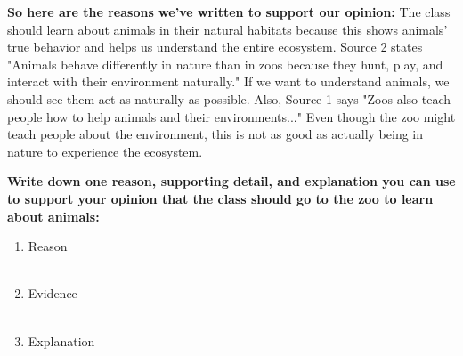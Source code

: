 \documentclass[12pt]{article}
\begin{document}
\begin{tcolorbox}[colframe=black!60, colback=white, 
coltitle=black, colbacktitle=black!15, fonttitle=\bfseries\Large, 
title=Examples, halign title=center, left=10pt, right=10pt, top=10pt, bottom=15pt]
\textbf{So here are the reasons we've written to support our opinion:} The class should learn about animals in their natural habitats because this shows animals' true behavior and helps us understand the entire ecosystem. Source 2 states  "Animals behave differently in nature than in zoos because they hunt, play, and interact with their environment naturally." If we want to understand animals, we should see them act as naturally as possible. Also, Source 1 says "Zoos also teach people how to help animals and their environments..." Even though the zoo might teach people about the environment, this is not as good as actually being in nature to experience the ecosystem.




 


     \end{tcolorbox}
\vspace{1em}



\begin{tcolorbox}[colframe=black!60, colback=white, 
coltitle=black, colbacktitle=black!15, fonttitle=\bfseries\Large, 
title=Guided Practice, halign title=center, left=10pt, right=10pt, top=10pt, bottom=15pt]
\textbf{Write down one reason, supporting detail, and explanation you can use to support your opinion that the class should go to the zoo to learn about animals:}
\begin{enumerate}[itemsep=3em] %
    \item Reason
    \\[0.8cm] \underline{\hspace{14.3cm}}  
    \\[0.8cm] \underline{\hspace{14.3cm}} 
    \item Evidence
     \\[0.8cm] \underline{\hspace{14.3cm}}  
    \\[0.8cm] \underline{\hspace{14.3cm}} 
    \item Explanation
       \\[0.8cm] \underline{\hspace{14.3cm}}  
    \\[0.8cm] \underline{\hspace{14.3cm}} 

\vspace{1.5em}\end{enumerate}
\end{tcolorbox}
\vspace{2em}
\end{document}
